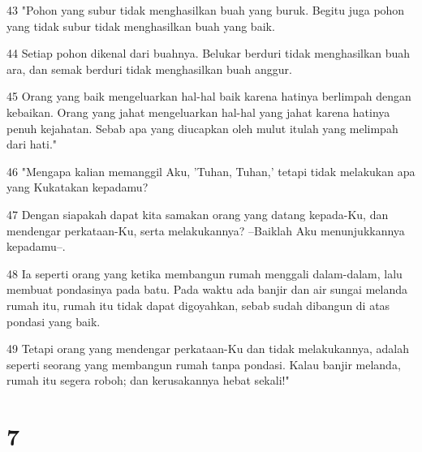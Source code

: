 \par 43 "Pohon yang subur tidak menghasilkan buah yang buruk. Begitu juga pohon yang tidak subur tidak menghasilkan buah yang baik.
\par 44 Setiap pohon dikenal dari buahnya. Belukar berduri tidak menghasilkan buah ara, dan semak berduri tidak menghasilkan buah anggur.
\par 45 Orang yang baik mengeluarkan hal-hal baik karena hatinya berlimpah dengan kebaikan. Orang yang jahat mengeluarkan hal-hal yang jahat karena hatinya penuh kejahatan. Sebab apa yang diucapkan oleh mulut itulah yang melimpah dari hati."
\par 46 "Mengapa kalian memanggil Aku, 'Tuhan, Tuhan,' tetapi tidak melakukan apa yang Kukatakan kepadamu?
\par 47 Dengan siapakah dapat kita samakan orang yang datang kepada-Ku, dan mendengar perkataan-Ku, serta melakukannya? --Baiklah Aku menunjukkannya kepadamu--.
\par 48 Ia seperti orang yang ketika membangun rumah menggali dalam-dalam, lalu membuat pondasinya pada batu. Pada waktu ada banjir dan air sungai melanda rumah itu, rumah itu tidak dapat digoyahkan, sebab sudah dibangun di atas pondasi yang baik.
\par 49 Tetapi orang yang mendengar perkataan-Ku dan tidak melakukannya, adalah seperti seorang yang membangun rumah tanpa pondasi. Kalau banjir melanda, rumah itu segera roboh; dan kerusakannya hebat sekali!"

\chapter{7}


